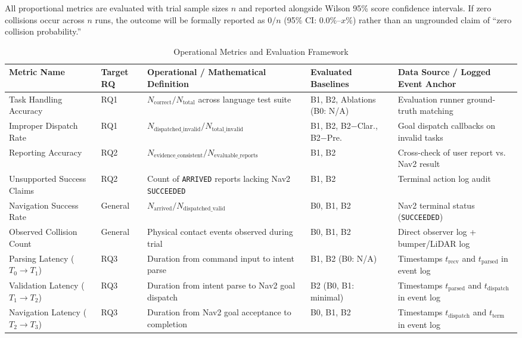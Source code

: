 \documentclass[conference]{IEEEtran}
\begin{document}
All proportional metrics are evaluated with trial sample sizes $n$ and reported alongside Wilson 95\% score confidence intervals. If zero collisions occur across $n$ runs, the outcome will be formally reported as $0/n$ (95\% CI: $0.0\% \text{--} x\%$) rather than an ungrounded claim of ``zero collision probability.''

\begin{table}[t]
\caption{Operational Metrics and Evaluation Framework}
\label{tab:metrics}
\centering
\scriptsize
\begin{tabular}{p{3.2cm}p{1.2cm}p{4.8cm}p{2.2cm}p{3.8cm}}
\toprule
\textbf{Metric Name} & \textbf{Target RQ} & \textbf{Operational / Mathematical Definition} & \textbf{Evaluated Baselines} & \textbf{Data Source / Logged Event Anchor} \\
\midrule
Task Handling Accuracy & RQ1 & $N_{\text{correct}} / N_{\text{total}}$ across language test suite & B1, B2, Ablations (B0: N/A) & Evaluation runner ground-truth matching \\
Improper Dispatch Rate & RQ1 & $N_{\text{dispatched\_invalid}} / N_{\text{total\_invalid}}$ & B1, B2, B2$-$Clar., B2$-$Pre. & Goal dispatch callbacks on invalid tasks \\
Reporting Accuracy & RQ2 & $N_{\text{evidence\_consistent}} / N_{\text{evaluable\_reports}}$ & B1, B2 & Cross-check of user report vs. Nav2 result \\
Unsupported Success Claims & RQ2 & Count of \texttt{ARRIVED} reports lacking Nav2 \texttt{SUCCEEDED} & B1, B2 & Terminal action log audit \\
Navigation Success Rate & General & $N_{\text{arrived}} / N_{\text{dispatched\_valid}}$ & B0, B1, B2 & Nav2 terminal status (\texttt{SUCCEEDED}) \\
Observed Collision Count & General & Physical contact events observed during trial & B0, B1, B2 & Direct observer log + bumper/LiDAR log \\
Parsing Latency ($T_0 \to T_1$) & RQ3 & Duration from command input to intent parse & B1, B2 (B0: N/A) & Timestamps $t_{\text{recv}}$ and $t_{\text{parsed}}$ in event log \\
Validation Latency ($T_1 \to T_2$) & RQ3 & Duration from intent parse to Nav2 goal dispatch & B2 (B0, B1: minimal) & Timestamps $t_{\text{parsed}}$ and $t_{\text{dispatch}}$ in event log \\
Navigation Latency ($T_2 \to T_3$) & RQ3 & Duration from Nav2 goal acceptance to completion & B0, B1, B2 & Timestamps $t_{\text{dispatch}}$ and $t_{\text{term}}$ in event log \\
\bottomrule
\end{tabular}
\end{table}
\end{document}
